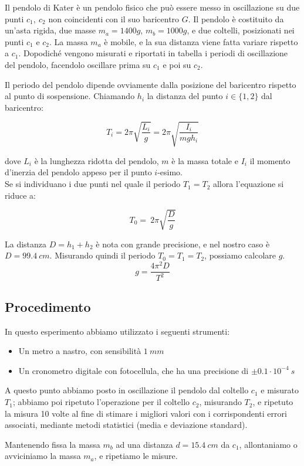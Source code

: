 Il pendolo di Kater è un pendolo fisico che può essere messo in oscillazione su due punti $c_1,\ c_2$ non coincidenti con il suo baricentro $G$. Il pendolo è costituito da un'asta rigida, due masse $m_a = 1400g$, $m_b=1000g$, e due coltelli, posizionati nei punti $c_1$ e $c_2$. La massa $m_a$ è mobile, e la sua distanza viene fatta variare rispetto a $c_1$. Dopodiché vengono misurati e riportati in tabella i periodi di oscillazione del pendolo, facendolo oscillare prima su $c_1$ e poi su $c_2$.

Il periodo del pendolo dipende ovviamente dalla posizione del baricentro rispetto al punto di sospensione. Chiamando $h_i$ la distanza del punto $i\in\{1,2\}$ dal baricentro:

$$ T_i = 2 \pi \sqrt{\frac{L_i}{g}} = 2 \pi \sqrt{\frac{I_i}{m gh_i}}$$

dove $L_i$ è la lunghezza ridotta del pendolo, $m$ è la massa totale e $I_i$ il momento d'inerzia del pendolo appeso per il punto $i$-esimo.
\\
Se si individuano i due punti nel quale il periodo $T_1 = T_2$ allora l'equazione si riduce a:

$$ T_0 = \ 2 \pi \sqrt{\frac{D}{g}}$$

La distanza $D= h_1 + h_2 $  è nota con grande precisione, e nel nostro caso è $D=99.4\ cm$. Misurando quindi il periodo $T_0=T_1=T_2$, possiamo calcolare $g$.
$$ g = \frac{4\pi^2D}{T^2}$$
\subsection{Procedimento}

In questo esperimento abbiamo utilizzato i seguenti strumenti:
\begin{itemize}
  \item Un metro a nastro, con sensibilità $1\ mm$
  \item Un cronometro digitale con fotocellula, che ha una precisione di $\pm 0.1 \cdot 10^{-4}\ s$
\end{itemize}

A questo punto abbiamo posto in oscillazione il pendolo dal coltello $c_1$ e misurato $T_1$; abbiamo poi ripetuto l'operazione per il coltello $c_2$, misurando $T_2$, e ripetuto la misura 10 volte al fine di stimare i migliori valori con i corrispondenti errori associati, mediante metodi statistici (media e deviazione standard).

Mantenendo fissa la massa $m_b$ ad una distanza $d = 15.4\ cm$ da $c_1$, allontaniamo o avviciniamo la massa $m_a$, e ripetiamo le misure.

